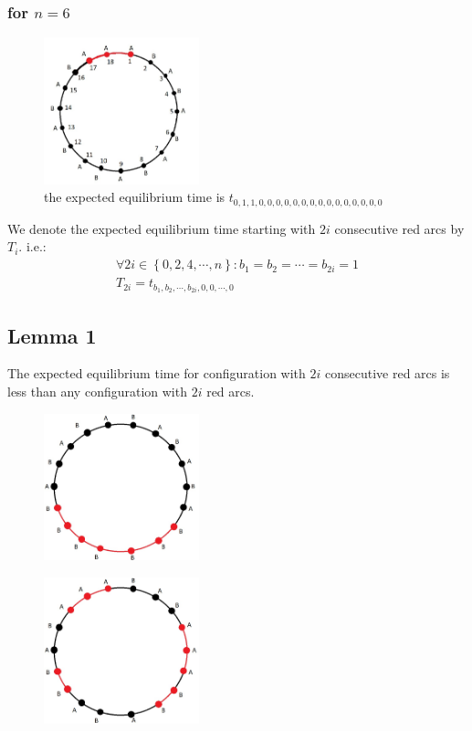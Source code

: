 \documentclass[]{book}
\theoremstyle{definition}
\begin{document}
\subsubsection{for $n=6$}
\begin{figure}[H]
    \centering\includegraphics[width=0.4\textwidth]{figures/t0.jpg}
    \caption{the expected equilibrium time is $t_{0,1,1,0,0,0,0,0,0,0,0,0,0,0,0,0,0,0}$}
\end{figure}
We denote the expected equilibrium time starting with $2i$ consecutive red arcs by $T_i$. i.e.:
\begin{equation}
\begin{split}
    \forall 2i \in \left\{ 0, 2, 4, \cdots, n \right\}:b_1=b_2=\cdots=b_{2i}=1 \\ T_{2i} = t_{b_1, b_2, \cdots, b_{2i}, 0, 0, \cdots, 0}
\end{split}
\end{equation}

\subsection{Lemma 1}
The expected equilibrium time for configuration with $2i$ consecutive red arcs is less than any configuration with $2i$ red arcs.

\begin{figure}[H]
    \centering\includegraphics[width=0.4\textwidth]{figures/lemma.a.jpg}
    \caption{}
\end{figure}
\begin{figure}[H]
    \centering\includegraphics[width=0.4\textwidth]{figures/lemma.b.jpg}
    \caption{}
\end{figure}
\end{document}
